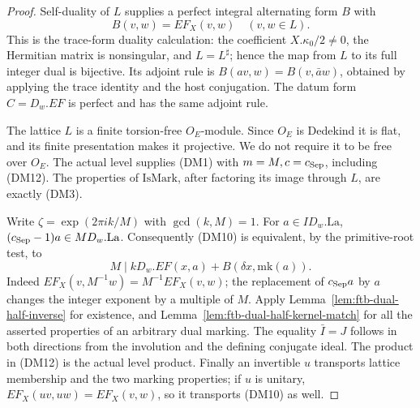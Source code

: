 \begin{proof}
Self-duality of \(L\) supplies a perfect integral alternating
form \(B\) with
\[
                    B(v,w)=EF_X(v,w)\quad(v,w\in L).
\]
This is the trace-form duality calculation:
the coefficient \(X.\kappa_0/2\ne0\), the Hermitian matrix
is nonsingular, and \(L=L^\sharp\); hence the map from \(L\)
to its full integer dual is bijective.
Its adjoint rule is
\(B(av,w)=B(v,\bar a w)\), obtained by applying the trace
identity and the host conjugation.
The datum form \(C=D_w.EF\) is perfect and has the same
adjoint rule.

The lattice \(L\) is a finite torsion-free \(O_E\)-module.
Since \(O_E\) is Dedekind it is flat, and its finite
presentation makes it projective.
We do not require it to be free over \(O_E\).
The actual level supplies (DM1) with
\(m=M,c=c_{\rm Sep}\), including (DM12).
The properties of \(\mathrm{IsMark}\), after factoring its
image through \(L\), are exactly (DM3).

Write \(\zeta=\exp(2\pi i k/M)\) with \(\gcd(k,M)=1\).
For \(a\in I D_w.\mathrm{La}\),
\((c_{\rm Sep}-1)a\in M D_w.\mathrm{La}\).
Consequently (DM10) is equivalent, by the primitive-root
test, to
\[
 M\mid kD_w.EF(x,a)+B(\delta x,\mathrm{mk}(a)).          \tag{DM13}
\]
Indeed \(EF_X(v,M^{-1}w)=M^{-1}EF_X(v,w)\);
the replacement of \(c_{\rm Sep}a\) by \(a\) changes the
integer exponent by a multiple of \(M\).
Apply Lemma~\ref{lem:ftb-dual-half-inverse} for existence,
and Lemma~\ref{lem:ftb-dual-half-kernel-match} for all
the asserted properties of an arbitrary dual marking.
The equality \(\bar I=J\) follows in both directions from
the involution and the defining conjugate ideal.
The product in (DM12) is the actual level product.
Finally an invertible \(u\) transports lattice membership
and the two marking properties; if \(u\) is unitary,
\(EF_X(uv,uw)=EF_X(v,w)\), so it transports (DM10) as well.
\end{proof}

